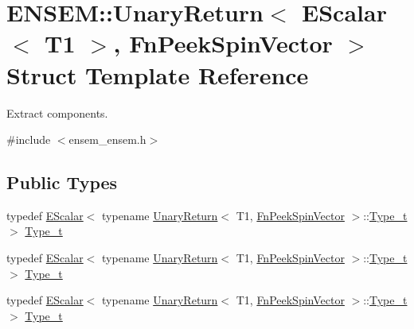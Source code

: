 \hypertarget{structENSEM_1_1UnaryReturn_3_01EScalar_3_01T1_01_4_00_01FnPeekSpinVector_01_4}{}\section{E\+N\+S\+EM\+:\+:Unary\+Return$<$ E\+Scalar$<$ T1 $>$, Fn\+Peek\+Spin\+Vector $>$ Struct Template Reference}
\label{structENSEM_1_1UnaryReturn_3_01EScalar_3_01T1_01_4_00_01FnPeekSpinVector_01_4}


Extract components.  




{\ttfamily \#include $<$ensem\+\_\+ensem.\+h$>$}

\subsection*{Public Types}
\begin{DoxyCompactItemize}
\item 
typedef \mbox{\hyperlink{classENSEM_1_1EScalar}{E\+Scalar}}$<$ typename \mbox{\hyperlink{structENSEM_1_1UnaryReturn}{Unary\+Return}}$<$ T1, \mbox{\hyperlink{structENSEM_1_1FnPeekSpinVector}{Fn\+Peek\+Spin\+Vector}} $>$\+::\mbox{\hyperlink{structENSEM_1_1UnaryReturn_3_01EScalar_3_01T1_01_4_00_01FnPeekSpinVector_01_4_ab36dc210813249d571d0447c7da504ac}{Type\+\_\+t}} $>$ \mbox{\hyperlink{structENSEM_1_1UnaryReturn_3_01EScalar_3_01T1_01_4_00_01FnPeekSpinVector_01_4_ab36dc210813249d571d0447c7da504ac}{Type\+\_\+t}}
\item 
typedef \mbox{\hyperlink{classENSEM_1_1EScalar}{E\+Scalar}}$<$ typename \mbox{\hyperlink{structENSEM_1_1UnaryReturn}{Unary\+Return}}$<$ T1, \mbox{\hyperlink{structENSEM_1_1FnPeekSpinVector}{Fn\+Peek\+Spin\+Vector}} $>$\+::\mbox{\hyperlink{structENSEM_1_1UnaryReturn_3_01EScalar_3_01T1_01_4_00_01FnPeekSpinVector_01_4_ab36dc210813249d571d0447c7da504ac}{Type\+\_\+t}} $>$ \mbox{\hyperlink{structENSEM_1_1UnaryReturn_3_01EScalar_3_01T1_01_4_00_01FnPeekSpinVector_01_4_ab36dc210813249d571d0447c7da504ac}{Type\+\_\+t}}
\item 
typedef \mbox{\hyperlink{classENSEM_1_1EScalar}{E\+Scalar}}$<$ typename \mbox{\hyperlink{structENSEM_1_1UnaryReturn}{Unary\+Return}}$<$ T1, \mbox{\hyperlink{structENSEM_1_1FnPeekSpinVector}{Fn\+Peek\+Spin\+Vector}} $>$\+::\mbox{\hyperlink{structENSEM_1_1UnaryReturn_3_01EScalar_3_01T1_01_4_00_01FnPeekSpinVector_01_4_ab36dc210813249d571d0447c7da504ac}{Type\+\_\+t}} $>$ \mbox{\hyperlink{structENSEM_1_1UnaryReturn_3_01EScalar_3_01T1_01_4_00_01FnPeekSpinVector_01_4_ab36dc210813249d571d0447c7da504ac}{Type\+\_\+t}}
\end{DoxyCompactItemize}



